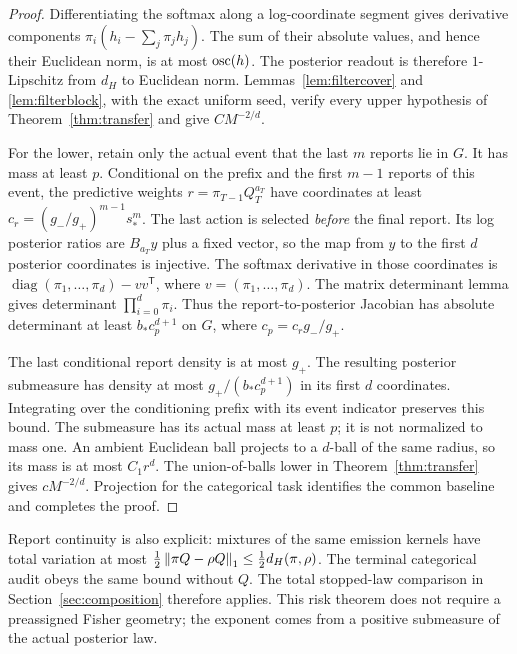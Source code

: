 \begin{proof}
Differentiating the softmax along a log-coordinate segment gives derivative components $\pi_i(h_i-\sum_j\pi_jh_j)$. The sum of their absolute values, and hence their Euclidean norm, is at most $\operatorname{osc}(h)$. The posterior readout is therefore $1$-Lipschitz from $d_H$ to Euclidean norm. Lemmas~\ref{lem:filtercover} and \ref{lem:filterblock}, with the exact uniform seed, verify every upper hypothesis of Theorem~\ref{thm:transfer} and give $CM^{-2/d}$.

For the lower, retain only the actual event that the last $m$ reports lie in $G$. It has mass at least $p$. Conditional on the prefix and the first $m-1$ reports of this event, the predictive weights $r=\pi_{T-1}Q_T^{a_T}$ have coordinates at least $c_r=(g_-/g_+)^{m-1}s_*^m$. The last action is selected \emph{before} the final report. Its log posterior ratios are $B_{a_T}y$ plus a fixed vector, so the map from $y$ to the first $d$ posterior coordinates is injective. The softmax derivative in those coordinates is $\operatorname{diag}(\pi_1,\ldots,\pi_d)-vv^{\mathsf T}$, where $v=(\pi_1,\ldots,\pi_d)$. The matrix determinant lemma gives determinant $\prod_{i=0}^d\pi_i$. Thus the report-to-posterior Jacobian has absolute determinant at least $b_*c_p^{d+1}$ on $G$, where $c_p=c_r g_-/g_+$.

The last conditional report density is at most $g_+$. The resulting posterior submeasure has density at most $g_+/(b_*c_p^{d+1})$ in its first $d$ coordinates. Integrating over the conditioning prefix with its event indicator preserves this bound. The submeasure has its actual mass at least $p$; it is not normalized to mass one. An ambient Euclidean ball projects to a $d$-ball of the same radius, so its mass is at most $C_1r^d$. The union-of-balls lower in Theorem~\ref{thm:transfer} gives $cM^{-2/d}$. Projection for the categorical task identifies the common baseline and completes the proof.
\end{proof}

Report continuity is also explicit: mixtures of the same emission kernels have total variation at most $\frac12\left\lVert\pi Q-\rho Q\right\rVert_1\le\frac12d_H(\pi,\rho)$. The terminal categorical audit obeys the same bound without $Q$. The total stopped-law comparison in Section~\ref{sec:composition} therefore applies. This risk theorem does not require a preassigned Fisher geometry; the exponent comes from a positive submeasure of the actual posterior law.

